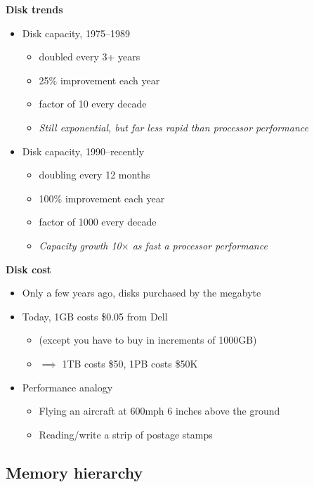 \documentclass[11pt,a4paper]{article}
\begin{document}
\textbf{Disk trends}
\begin{itemize}
    \item Disk capacity, 1975--1989
        \begin{itemize}
            \item doubled every 3+ years
            \item 25\% improvement each year
            \item factor of 10 every decade
            \item \emph{Still exponential, but far less rapid than processor performance}
        \end{itemize}
    \item Disk capacity, 1990--recently
        \begin{itemize}
            \item doubling every 12 months
            \item 100\% improvement each year
            \item factor of 1000 every decade
            \item \emph{Capacity growth 10$\times$ as fast a processor performance}
        \end{itemize}
\end{itemize}

\textbf{Disk cost}
\begin{itemize}
    \item Only a few years ago, disks purchased by the megabyte
    \item Today, 1GB costs \$0.05 from Dell
        \begin{itemize}
            \item (except you have to buy in increments of 1000GB)
            \item $\implies$ 1TB costs \$50, 1PB costs \$50K
        \end{itemize}
    \item Performance analogy
        \begin{itemize}
            \item Flying an aircraft at 600mph 6 inches above the ground
            \item Reading/write a strip of postage stamps
        \end{itemize}
\end{itemize}

\subsection{Memory hierarchy}
\end{document}
